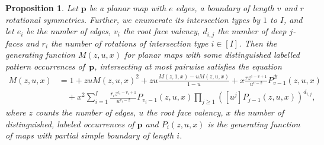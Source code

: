 \documentclass[reqno, 11pt]{amsart}
\newtheorem{proposition}{Proposition}
\theoremstyle{definition}
\theoremstyle{remark}
\newcommand{\map}[1]{\textbf{#1}}
\numberwithin{equation}{section}
\begin{document}
\begin{proposition}
    Let $\map{p}$ be a planar map with $e$ edges, a boundary of length $v$ and $r$ rotational symmetries. Further, we enumerate its intersection types by $1$ to $I$, and let $e_i$ be the number of edges, $v_i$ the root face valency, $d_{i,j}$ the number of deep $j$-faces and $r_i$ the number of rotations of intersection type $i \in [I]$. Then the generating function $M(z,u,x)$ for planar maps with some distinguished labelled pattern occurrences of~$\map{p}$, intersecting at most pairwise satisfies the equation
    \begin{align}
        M(z,u,x) &= 1+zuM(z,u,x)^2 + zu\frac{M(z,1,x)-uM(z,u,x)}{1-u} + x\frac{rz^{e-v+1}}{u^{v-2}}P^\mathcal{B}_{v-1}(z,u,x)\nonumber \\
        &\quad+ x^2\sum_{i=1}^I \frac{r_iz^{e_i-v_i+1}}{u^{v_i-2}}P_{v_i-1}(z,u,x)\prod_{j\geq 1}\left([u^j]P_{j-1}(z,u,x)\right)^{d_{i,j}}, \label{eq:bipartite}
    \end{align}
    where $z$ counts the number of edges, $u$ the root face valency, $x$ the number of distinguished, labeled occurrences of $\map{p}$ and $P_i(z,u,x)$ is the generating function of maps with partial simple boundary of length $i$.
\end{proposition}
\end{document}
